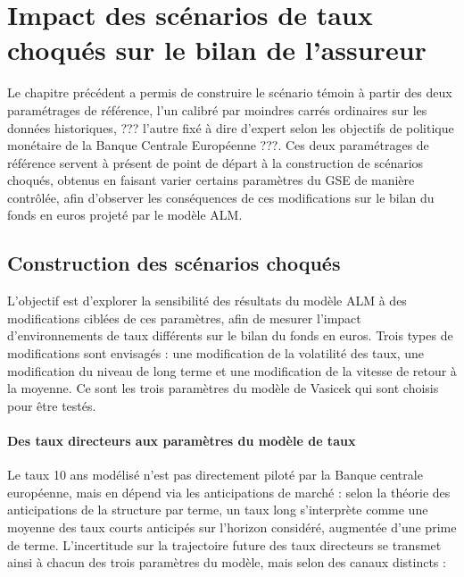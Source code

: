 \chapter{Impact des scénarios de taux choqués sur le bilan de l'assureur}
\label{chap:impact_des_scenarios_de_taux_choques}

Le chapitre précédent a permis de construire le scénario témoin à partir des deux paramétrages de référence, l'un calibré par moindres carrés ordinaires sur les données historiques, ??? l'autre fixé à dire d'expert selon les objectifs de politique monétaire de la Banque Centrale Européenne ???. Ces deux paramétrages de référence servent à présent de point de départ à la construction de scénarios choqués, obtenus en faisant varier certains paramètres du GSE de manière contrôlée, afin d'observer les conséquences de ces modifications sur le bilan du fonds en euros projeté par le modèle ALM.

\section{Construction des scénarios choqués}
\label{sec:construction_scenarios_choques}

L'objectif est d'explorer la sensibilité des résultats du modèle ALM à des modifications ciblées de ces paramètres, afin de mesurer l'impact d'environnements de taux différents sur le bilan du fonds en euros. Trois types de modifications sont envisagés : une modification de la volatilité des taux, une modification du niveau de long terme et une modification de la vitesse de retour à la moyenne. Ce sont les trois paramètres du modèle de Vasicek qui sont choisis pour être testés.

\subsubsection*{Des taux directeurs aux paramètres du modèle de taux}

Le taux 10 ans modélisé n'est pas directement piloté par la Banque centrale européenne, mais en dépend via les anticipations de marché : selon la théorie des anticipations de la structure par terme, un taux long s'interprète comme une moyenne des taux courts anticipés sur l'horizon considéré, augmentée d'une prime de terme. L'incertitude sur la trajectoire future des taux directeurs se transmet ainsi à chacun des trois paramètres du modèle, mais selon des canaux distincts :

